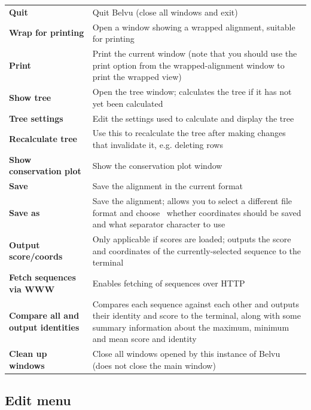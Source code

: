 \documentclass[letterpaper]{article}
\begin{document}
\begin{supertabular}{>{\bfseries}p{0.3\textwidth} p{0.7\textwidth}}
Quit  &
Quit Belvu (close all windows and exit)\\
Wrap for printing &
Open a window showing a wrapped alignment, suitable for printing\\
Print &
Print the current window (note that you should use the print option from the wrapped-alignment window to print the wrapped view)\\
Show tree &
Open the tree window; calculates the tree if it has not yet been calculated\\
Tree settings  &
Edit the settings used to calculate and display the tree\\
Recalculate tree  &
Use this to recalculate the tree after making changes that invalidate it, e.g. deleting rows\\
Show conservation plot  &
Show the conservation plot window\\
Save  &
Save the alignment in the current format\\
Save as  &
Save the alignment; allows you to select a different file format and choose \ whether coordinates should be saved and what separator character to use\\
Output score/coords  &
Only applicable if scores are loaded; outputs the score and coordinates of the currently-selected sequence to the terminal\\
Fetch sequences via WWW  &
Enables fetching of sequences over HTTP\\
Compare all and output identities  &
Compares each sequence against each other and outputs their identity and score to the terminal, along with some summary information about the maximum, minimum and mean score and identity\\
Clean up windows  &
Close all windows opened by this instance of Belvu (does not close the main window)\\
\end{supertabular}


\subsection[Edit menu]{Edit menu}
\end{document}

